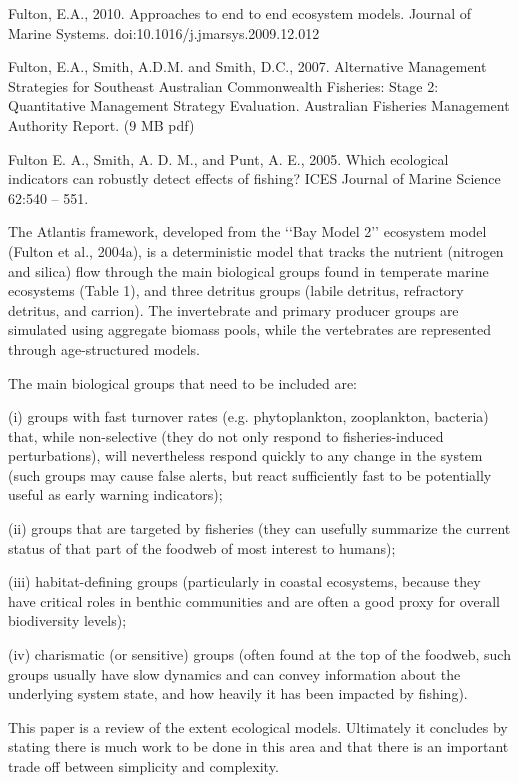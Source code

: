 \documentclass{report}
\begin{document}
Fulton, E.A., 2010. Approaches to end to end ecosystem models. Journal of Marine Systems. doi:10.1016/j.jmarsys.2009.12.012 


Fulton, E.A., Smith, A.D.M. and Smith, D.C., 2007. Alternative Management Strategies for Southeast Australian Commonwealth Fisheries: Stage 2: Quantitative Management Strategy Evaluation. Australian Fisheries Management Authority Report. (9 MB pdf)

Fulton E. A., Smith, A. D. M., and Punt, A. E., 2005. Which ecological indicators can robustly detect effects of fishing? ICES Journal of Marine Science 62:540 – 551.

The Atlantis framework, developed from the ‘‘Bay Model 2’’ ecosystem model (Fulton et al., 2004a), is a deterministic model that tracks the nutrient (nitrogen and silica) flow through the main biological groups found in temperate marine ecosystems (Table 1), and three detritus
groups (labile detritus, refractory detritus, and carrion). The invertebrate and primary producer groups are simulated using aggregate biomass pools, while the vertebrates are
represented through age-structured models.

The main biological groups that need to be included are:

(i) groups with fast turnover rates (e.g. phytoplankton, zooplankton, bacteria) that, while non-selective (they do not only respond to fisheries-induced perturbations), will nevertheless respond quickly to any change in the system (such groups may cause false alerts, but react sufficiently fast to be potentially useful as early warning indicators);

(ii) groups that are targeted by fisheries (they can usefully summarize the current status of that part of the foodweb of most interest to humans);

(iii) habitat-defining groups (particularly in coastal ecosystems, because they have critical roles in
benthic communities and are often a good proxy for overall biodiversity levels);

(iv) charismatic (or sensitive) groups (often found at the top of the foodweb, such groups usually have slow dynamics and can convey information about the underlying system state, and how heavily it has been impacted by fishing).



\cite{fulton2003effect}
This paper is a review of the extent ecological models. Ultimately it concludes by stating there is much work to be done in this area and that there is an important trade off between simplicity and complexity. 
\end{document}
